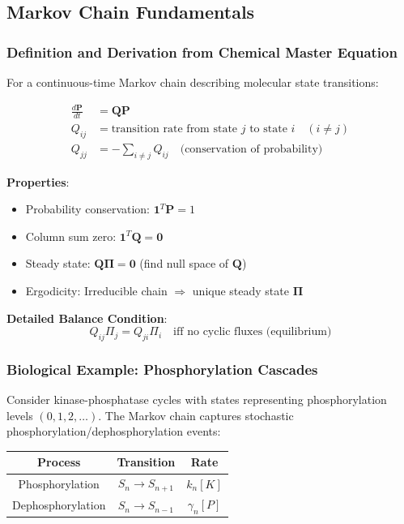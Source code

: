 \documentclass[12pt]{article}
\begin{document}
\subsection{Markov Chain Fundamentals}

\subsubsection{Definition and Derivation from Chemical Master Equation}

For a continuous-time Markov chain describing molecular state transitions:

\begin{align}
    \frac{d\mathbf{P}}{dt} &= \mathbf{Q} \mathbf{P} \\
    Q_{ij} &= \text{transition rate from state } j \text{ to state } i \quad (i \neq j) \\
    Q_{jj} &= -\sum_{i \neq j} Q_{ij} \quad \text{(conservation of probability)}
\end{align}

\textbf{Properties}:
\begin{itemize}
    \item Probability conservation: $\mathbf{1}^T \mathbf{P} = 1$
    \item Column sum zero: $\mathbf{1}^T \mathbf{Q} = \mathbf{0}$
    \item Steady state: $\mathbf{Q} \boldsymbol{\Pi} = \mathbf{0}$ (find null space of $\mathbf{Q}$)
    \item Ergodicity: Irreducible chain $\Rightarrow$ unique steady state $\boldsymbol{\Pi}$
\end{itemize}

\textbf{Detailed Balance Condition}:
\begin{equation}
    Q_{ij} \Pi_j = Q_{ji} \Pi_i \quad \text{iff no cyclic fluxes (equilibrium)}
\end{equation}

\subsubsection{Biological Example: Phosphorylation Cascades}

Consider kinase-phosphatase cycles with states representing phosphorylation levels $(0,1,2,\dots)$. The Markov chain captures stochastic phosphorylation/dephosphorylation events:

\begin{center}
\begin{tabular}{c|c|c}
\textbf{Process} & \textbf{Transition} & \textbf{Rate} \\
\hline
Phosphorylation & $S_n \rightarrow S_{n+1}$ & $k_n[K]$ \\
Dephosphorylation & $S_n \rightarrow S_{n-1}$ & $\gamma_n[P]$ \\
\end{tabular}
\end{center}
\end{document}
